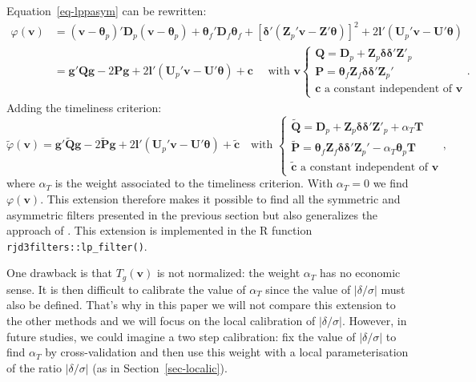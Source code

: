 \documentclass[
]{article}
\newcommand\1{\mathds{1}}
\begin{document}
Equation~\ref{eq-lppasym} can be rewritten: \begin{align*}
\varphi(\boldsymbol v)&=(\boldsymbol v-\boldsymbol \theta_p)'\boldsymbol D_{p}(\boldsymbol v-\boldsymbol \theta_p)+
  \boldsymbol \theta_f'\boldsymbol D_{f}\boldsymbol \theta_f+
  [\boldsymbol \delta'(\boldsymbol Z_{p}'\boldsymbol v-\boldsymbol Z'\boldsymbol \theta)]^{2}+
2\boldsymbol l'(\boldsymbol U_{p}'\boldsymbol v-\boldsymbol U'\boldsymbol \theta)\\
&=\boldsymbol g'\boldsymbol Q\boldsymbol g-2\boldsymbol P\boldsymbol g+2\boldsymbol l'(\boldsymbol U_{p}'\boldsymbol v-\boldsymbol U'\boldsymbol \theta)+\boldsymbol c\quad\text{ with }\boldsymbol v
\begin{cases}
\boldsymbol Q=\boldsymbol D_p+\boldsymbol Z_p\boldsymbol \delta\boldsymbol \delta'\boldsymbol Z'_p \\
\boldsymbol P=\boldsymbol \theta_f\boldsymbol Z_f\boldsymbol \delta\boldsymbol \delta'\boldsymbol Z_p'\\
\boldsymbol c\text{ a constant independent of }\boldsymbol v
\end{cases}.
\end{align*} Adding the timeliness criterion: \[
\widetilde\varphi(\boldsymbol v)=\boldsymbol g'\widetilde {\boldsymbol Q}\boldsymbol g-
2\widetilde {\boldsymbol P}\boldsymbol g+2\boldsymbol l'(\boldsymbol U_{p}'\boldsymbol v-\boldsymbol U'\boldsymbol \theta)+
\widetilde {\boldsymbol c}\quad\text{with }
\begin{cases}
\widetilde {\boldsymbol Q}=\boldsymbol D_p+\boldsymbol Z_p\boldsymbol \delta\boldsymbol \delta'\boldsymbol Z'_p + \alpha_T\boldsymbol T\\
\widetilde {\boldsymbol P}=\boldsymbol \theta_f\boldsymbol Z_f\boldsymbol \delta\boldsymbol \delta'\boldsymbol Z_p'-\alpha_T\boldsymbol \theta_p\boldsymbol T\\
\widetilde {\boldsymbol c}\text{ a constant independent of }\boldsymbol v
\end{cases},
\] where \(\alpha_T\) is the weight associated to the timeliness
criterion. With \(\alpha_T=0\) we find \(\varphi(\boldsymbol v)\). This
extension therefore makes it possible to find all the symmetric and
asymmetric filters presented in the previous section but also
generalizes the approach of \textcite{GrayThomson1996}. This extension
is implemented in the R function \texttt{rjd3filters::lp\_filter()}.

One drawback is that \(T_g(\boldsymbol v)\) is not normalized: the
weight \(\alpha_T\) has no economic sense. It is then difficult to
calibrate the value of \(\alpha_T\) since the value of
\(\lvert\delta/\sigma\rvert\) must also be defined. That's why in this
paper we will not compare this extension to the other methods and we
will focus on the local calibration of \(\lvert\delta/\sigma\rvert\).
However, in future studies, we could imagine a two step calibration: fix
the value of \(\lvert\delta/\sigma\rvert\) to find \(\alpha_T\) by
cross-validation and then use this weight with a local parameterisation
of the ratio \(\lvert\delta/\sigma\rvert\) (as in
Section~\ref{sec-localic}).
\end{document}
